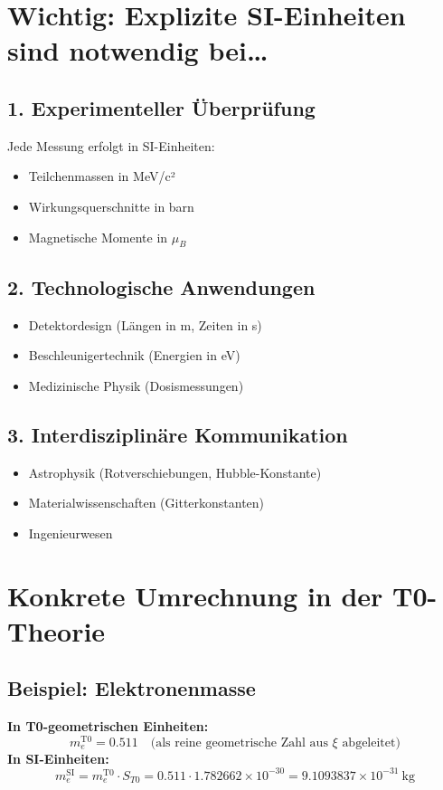 	\section{Wichtig: Explizite SI-Einheiten sind notwendig bei\dots}
	\label{sec:si-notwendig}
	
	\subsection{1. Experimenteller Überprüfung}
	Jede Messung erfolgt in SI-Einheiten:
	\begin{itemize}
		\item Teilchenmassen in MeV/c²
		\item Wirkungsquerschnitte in barn
		\item Magnetische Momente in $\mu_B$
	\end{itemize}
	
	\subsection{2. Technologische Anwendungen}
	\begin{itemize}
		\item Detektordesign (Längen in m, Zeiten in s)
		\item Beschleunigertechnik (Energien in eV)
		\item Medizinische Physik (Dosismessungen)
	\end{itemize}
	
	\subsection{3. Interdisziplinäre Kommunikation}
	\begin{itemize}
		\item Astrophysik (Rotverschiebungen, Hubble-Konstante)
		\item Materialwissenschaften (Gitterkonstanten)
		\item Ingenieurwesen
	\end{itemize}
	
	\section{Konkrete Umrechnung in der T0-Theorie}
	\label{sec:umrechnung}
	
	\subsection{Beispiel: Elektronenmasse}
	\textbf{In T0-geometrischen Einheiten:}
	\begin{equation}
		m_e^{\mathrm{T0}} = 0.511 \quad \text{(als reine geometrische Zahl aus $\xi$ abgeleitet)}
	\end{equation}
	\textbf{In SI-Einheiten:}
	\begin{equation}
		m_e^{\mathrm{SI}} = m_e^{\mathrm{T0}} \cdot S_{T0} = 0.511 \cdot 1.782662 \times 10^{-30} = 9.1093837 \times 10^{-31}~\mathrm{kg}
	\end{equation}
	
